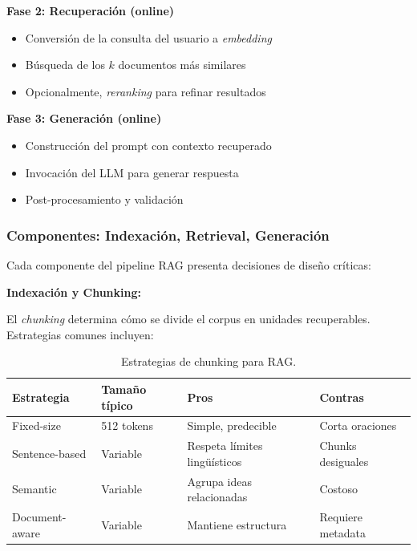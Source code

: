 \textbf{Fase 2: Recuperaci\'on (online)}
\begin{itemize}
    \item Conversi\'on de la consulta del usuario a \textit{embedding}
    \item B\'usqueda de los $k$ documentos m\'as similares
    \item Opcionalmente, \textit{reranking} para refinar resultados
\end{itemize}

\textbf{Fase 3: Generaci\'on (online)}
\begin{itemize}
    \item Construcci\'on del prompt con contexto recuperado
    \item Invocaci\'on del LLM para generar respuesta
    \item Post-procesamiento y validaci\'on
\end{itemize}

\subsubsection{Componentes: Indexaci\'on, Retrieval, Generaci\'on}
\label{subsubsec:componentes-rag}

Cada componente del pipeline RAG presenta decisiones de dise\~no cr\'iticas:

\textbf{Indexaci\'on y Chunking:}

El \textit{chunking} determina c\'omo se divide el corpus en unidades recuperables. Estrategias comunes incluyen:

\begin{table}[H]
\centering
\caption{Estrategias de chunking para RAG.}
\label{tab:chunking-strategies}
\begin{tabular}{@{}llll@{}}
\toprule
\textbf{Estrategia} & \textbf{Tama\~no t\'ipico} & \textbf{Pros} & \textbf{Contras} \\
\midrule
Fixed-size & 512 tokens & Simple, predecible & Corta oraciones \\
Sentence-based & Variable & Respeta l\'imites ling\"u\'isticos & Chunks desiguales \\
Semantic & Variable & Agrupa ideas relacionadas & Costoso \\
Document-aware & Variable & Mantiene estructura & Requiere metadata \\
\bottomrule
\end{tabular}
\end{table}

